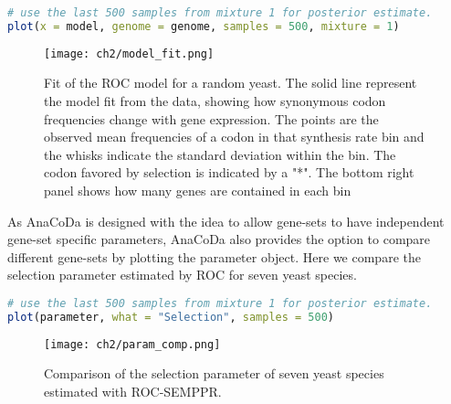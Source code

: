 \begin{lstlisting}[language=R]
# use the last 500 samples from mixture 1 for posterior estimate.
plot(x = model, genome = genome, samples = 500, mixture = 1)
\end{lstlisting}

\begin{figure}[h]
  \centering
  \texttt{[image: ch2/model\_fit.png]}\\
  \caption{Fit of the ROC model for a random yeast. The solid line represent the model fit from the data,
showing how synonymous codon frequencies change with gene expression. The points are the observed mean
frequencies of a codon in that synthesis rate bin and the whisks indicate the standard deviation within the bin.
The codon favored by selection is indicated by a "*". The bottom right panel shows how many genes are
contained in each bin}
  \label{fig:cub_dummy}
\end{figure} 

As AnaCoDa is designed with the idea to allow gene-sets to have independent gene-set specific parameters, AnaCoDa also provides the option to compare different gene-sets by plotting the parameter object. 
Here we compare the selection parameter estimated by ROC for seven yeast species.

\begin{lstlisting}[language=R]
# use the last 500 samples from mixture 1 for posterior estimate.
plot(parameter, what = "Selection", samples = 500)
\end{lstlisting}



\begin{figure}[h]
  \centering
  \texttt{[image: ch2/param\_comp.png]}\\
  \caption{Comparison of the selection parameter of seven yeast species estimated with ROC-SEMPPR.}
  \label{fig:comp_dummy}
\end{figure} 